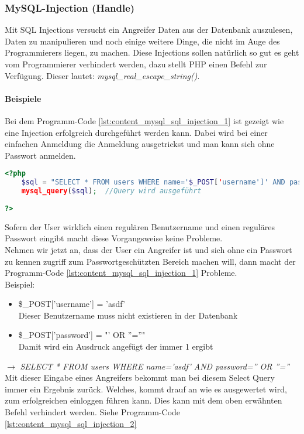\subsubsection{MySQL-Injection (Handle)}
Mit SQL Injections versucht ein Angreifer Daten aus der Datenbank auszulesen, Daten zu manipulieren und noch einige weitere Dinge, die nicht im Auge des Programmierers liegen, zu machen. Diese Injections sollen natürlich so gut es geht vom Programmierer verhindert werden, dazu stellt PHP einen Befehl zur Verfügung. Dieser lautet: \textit{mysql\_real\_escape\_string()}.
\paragraph{Beispiele}
Bei dem Programm-Code \ref{lst:content_mysql_sql_injection_1} ist gezeigt wie eine Injection erfolgreich durchgeführt werden kann. Dabei wird bei einer einfachen Anmeldung die Anmeldung ausgetrickst und man kann sich ohne Passwort anmelden.
\begin{lstlisting}[style=custom, language=PHP, caption={MySQL Injection: Falsch},label={lst:content_mysql_sql_injection_1}]
<?php 
	$sql = "SELECT * FROM users	WHERE name='$_POST['username']' AND password='$_POST['password']'";	//Die mitgegebenen Werte werden in den Query übernommen
	mysql_query($sql);	//Query wird ausgeführt
	
?>
\end{lstlisting}
Sofern der User wirklich einen regulären Benutzername und einen reguläres Passwort eingibt macht diese Vorgangsweise keine Probleme.\\
Nehmen wir jetzt an, dass der User ein Angreifer ist und sich ohne ein Passwort zu kennen zugriff zum Passwortgeschützten Bereich machen will, dann macht der Programm-Code \ref{lst:content_mysql_sql_injection_1} Probleme.\\
Beispiel:\\
\begin{itemize}
	\item \$\_POST['username'] = 'asdf'\\
	Dieser Benutzername muss nicht existieren in der Datenbank
	\item \$\_POST['password'] = "' OR ''=''"\\
	Damit wird ein Ausdruck angefügt der immer 1 ergibt
\end{itemize}
$ \rightarrow $ \textit{SELECT * FROM users WHERE name='asdf' AND password='' OR ''=''}\\
Mit dieser Eingabe eines Angreifers bekommt man bei diesem Select Query immer ein Ergebnis zurück. Welches, kommt drauf an wie es ausgewertet wird, zum erfolgreichen einloggen führen kann. Dies kann mit dem oben erwähnten Befehl verhindert werden. Siehe Programm-Code \ref{lst:content_mysql_sql_injection_2}
